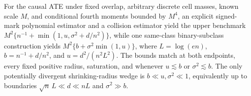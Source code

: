 For the causal ATE under fixed overlap, arbitrary discrete cell masses, known scale \(M\), and conditional fourth moments bounded by \(M^4\), an explicit signed-mark polynomial estimator and a collision estimator yield the upper benchmark \(M^2\{n^{-1}+\min(1,u,\sigma^2+d/n^2)\}\), while one same-class binary-subclass construction yields \(M^2\{b+\sigma^2\min(1,u)\}\), where \(L=\log(en)\), \(b=n^{-1}+d/n^2\), and \(u=d^2/(n^2L^2)\).  The bounds match at both endpoints, every fixed positive radius, saturation, and whenever \(u\lesssim b\) or \(\sigma^2\lesssim b\).  The only potentially divergent shrinking-radius wedge is \(b\ll u,\sigma^2\ll1\), equivalently up to boundaries \(\sqrt n\,L\ll d\ll nL\) and \(\sigma^2\gg b\).